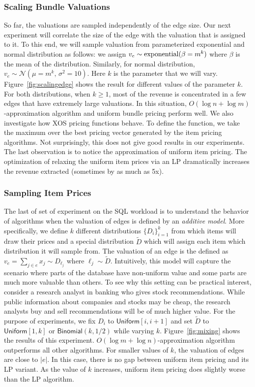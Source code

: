 \subsubsection{Scaling Bundle Valuations} So far, the valuations are sampled independently of the edge size. Our next experiment will correlate the size of the edge with the valuation that is assigned to it. To this end, we will sample valuation from parameterized exponential and normal distribution as follows: we assign $v_e \sim {\rm exponential}(\beta = m^k)$ where $\beta$ is the mean of the distribution. Similarly, for normal distribution, $v_e \sim \mathcal{N}(\mu = m^k,\, \sigma^2 = 10)$. Here $k$ is the parameter that we will vary. Figure~\ref{fig:scalingedge} shows the result for different values of the parameter $k$. For both distributions, when $k \geq 1$, most of the revenue is concentrated in a few edges that have extremely large valuations. In this situation, $O(\log n + \log m)$-approximation algorithm and uniform bundle pricing perform well. We also investigate how XOS pricing functions behave. To define the function, we take the maximum over the best pricing vector generated by the item pricing algorithms. Not surprisingly, this does not give good results in our experiments. The last observation is to notice the approximation of uniform item pricing. The optimization of relaxing the uniform item prices via an LP dramatically increases the revenue extracted (sometimes by as much as 5x).

\subsubsection{Sampling Item Prices} The last of set of experiment on the SQL workload is to understand the behavior of algorithms when the valuation of edges is defined by an \emph{additive model}. More specifically, we define $k$ different distributions $\{D_i\}_{i=1}^{k}$ from which items will draw their prices and a special distribution $\tilde{D}$ which will assign each item which distribution it will sample from. The valuation of an edge is the defined as $v_e = \sum_{j \in e} x_j \sim D_{\ell_j}$ where $\ell_j \sim \tilde{D}$. Intuitively, this model will capture the scenario where parts of the database have non-uniform value and some parts are much more valuable than others. To see why this setting can be practical interest, consider a research analyst in banking who gives stock recommendations. While public information about companies and stocks may be cheap, the research analysts buy and sell recommendations will be of much higher value. For the purpose of experiments, we fix $D_i$ to $\textsf{Uniform}[i, i+1]$ and set $\tilde{D}$ to $\textsf{Uniform}[1, k]$ or $\textsf{Binomial}(k, 1/2)$ while varying $k$. Figure~\ref{fig:mixing} shows the results of this experiment. $O(\log m + \log n)$-approximation algorithm outperforms all other algorithms. For smaller values of $k$, the valuation of edges are close to $|e|$. In this case, there is no gap between uniform item pricing and its LP variant. As  the value of $k$ increases, uniform item pricing does slightly worse than the LP algorithm.


